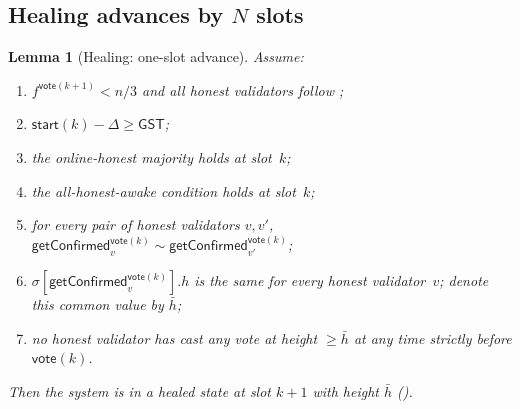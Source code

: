 \ifx\litemode\undefined\documentclass{article}\fi
\newcommand{\start}{\mathsf{start}}
\newcommand{\vote}{\mathsf{vote}}
\newcommand{\comm}[1]{\bar{#1}}
\newcommand{\getConfirmed}{\textsf{getConfirmed}\xspace}
\theoremstyle{plain}
\newtheorem{lemma}{Lemma}
\theoremstyle{definition}
\theoremstyle{remark}
\newcommand{\GST}{\ensuremath{\mathsf{GST}}}
\newcommand{\OHM}{online-honest majority\xspace}
\newcommand{\AHA}{all-honest-awake\xspace}
\begin{document}
\subsection{Healing advances by $N$ slots}\label{rev:sec:healing-advances}

\begin{lemma}[Healing: one-slot advance]\label{rev:lem:healing-one-slot}
Assume:
\begin{enumerate}
  \item $f^{\vote(k+1)} < n/3$ and all honest validators follow ;
  \item $\start(k) - \Delta \geq \GST$;
  \item the \OHM holds at slot~$k$;
  \item the \AHA condition holds at slot~$k$;
  \item for every pair of honest validators $v, v'$, $\getConfirmed_v^{\vote(k)} \sim \getConfirmed_{v'}^{\vote(k)}$;
  \item $\sigma[\getConfirmed_v^{\vote(k)}].h$ is the same for every honest validator~$v$; denote this common value by $\comm{h}$;
  \item no honest validator has cast any vote at height $\geq \comm{h}$ at any time strictly before $\vote(k)$.
\end{enumerate}
Then the system is in a healed state at slot $k+1$ with height $\comm{h}$ ().
\end{lemma}
\end{document}
